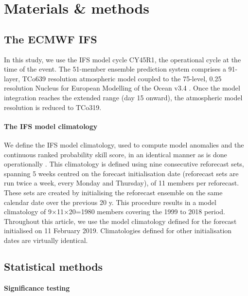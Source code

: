 \section{Materials \& methods}\label{ch3:methods}

  \subsection*{The ECMWF IFS}

    In this study, we use the IFS model cycle CY45R1, the operational cycle at the time of the event. The 51-member ensemble prediction system comprises a 91-layer, TCo639 resolution atmospheric model coupled to the 75-level, 0.25\textdegree{} resolution Nucleus for European Modelling of the Ocean v3.4 \citep{ecmwf_ifs_2018}. Once the model integration reaches the extended range (day 15 onward), the atmospheric model resolution is reduced to TCo319.


    \paragraph{The IFS model climatology}

      We define the IFS model climatology, used to compute model anomalies and the continuous ranked probability skill score, in an identical manner as is done operationally \citep[for example, to calculate the Extreme Forecast Index product][]{ecmwf_ecmwf_2018}. This climatology is defined using nine consecutive reforecast sets, spanning 5 weeks centred on the forecast initialisation date (reforecast sets are run twice a week, every Monday and Thursday), of 11 members per reforecast. These sets are created by initialising the reforecast ensemble on the same calendar date over the previous 20 y. This procedure results in a model climatology of 9$\times$11$\times$20=1980 members covering the 1999 to 2018 period. Throughout this article, we use the model climatology defined for the forecast initialised on 11 February 2019. Climatologies defined for other initialisation dates are virtually identical.

  \subsection*{Statistical methods}

    \paragraph{Significance testing}

